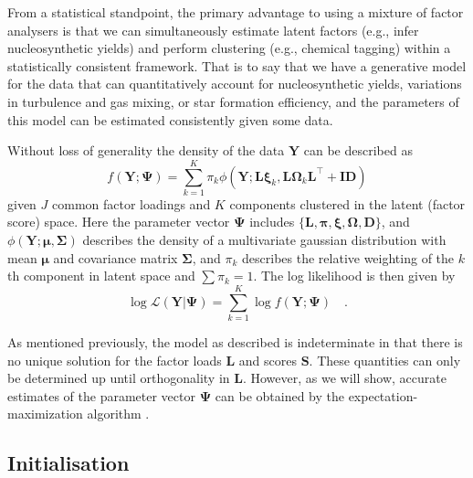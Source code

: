 \documentclass[twocolumn]{aastex62}
\newcommand{\vect}[1]{\boldsymbol{\mathbf{#1}}}
\renewcommand{\vec}[1]{\vect{#1}}
\newcommand{\weight}{\pi}
\newcommand{\data}{\textbf{Y}}
\newcommand{\vecdata}{\vec\data}
\newcommand{\transpose}{^\intercal}
\newcommand{\eye}{\textbf{I}}
\newcommand{\factorloads}{\textbf{L}}
\newcommand{\factorscores}{\textbf{S}}
\newcommand{\specificvariance}{\vec{D}}
\newcommand{\scoremeans}{\vec\xi}
\newcommand{\scorecovs}{\vec\Omega}
\newcommand{\NumLatentFactors}{J}
\newcommand{\NumComponents}{K}
\newcommand{\numcomponents}{k}
\begin{document}
From a statistical standpoint, the primary advantage to using
a mixture of factor analysers is that we can simultaneously
estimate latent factors (e.g., infer nucleosynthetic 
yields) and perform clustering (e.g., chemical tagging) 
within a statistically consistent framework. That is to say
that we have a generative model for the data that can 
quantitatively account for nucleosynthetic yields, variations in
turbulence and gas mixing, or star formation efficiency,
and the parameters of this model can be estimated consistently
given some data.

Without loss of generality the density of the data $\vecdata$ can be described as
\begin{equation}
	f(\vecdata; \vec\Psi) = \sum_{\numcomponents=1}^{\NumComponents}\weight_\numcomponents\phi(\vecdata;\factorloads\scoremeans_\numcomponents, \factorloads\scorecovs_\numcomponents\factorloads\transpose + \eye\specificvariance)
\end{equation}
\noindent{}given $\NumLatentFactors$ common factor loadings and $\NumComponents$ components
clustered in the latent (factor score) space. Here the parameter
vector
$\vec\Psi$ includes $\{\factorloads,\vec\pi,\scoremeans,\scorecovs,\specificvariance\}$, and $\phi(\vecdata;\vec\mu, \vec\Sigma)$
describes the density of a multivariate gaussian distribution with
mean $\vec\mu$ and covariance matrix $\vec\Sigma$,
and $\weight_\numcomponents$ describes the relative weighting of the $\numcomponents$th
component in latent space and $\sum\weight_\numcomponents = 1$.
The log likelihood is then given by
\begin{equation}
	\log\mathcal{L}(\vecdata|\vec\Psi) = \sum_{\numcomponents=1}^{\NumComponents}\log{f(\vecdata;\vec\Psi)} \quad . \label{eq:log-likelihood}
\end{equation}


As mentioned previously, the model as described is indeterminate in that
there is no unique solution for the factor loads $\factorloads$ and scores
$\factorscores$. These quantities can only be determined up until 
orthogonality in $\factorloads$. However, as we will show, accurate estimates
of the parameter vector $\vec\Psi$ can be obtained by the expectation-maximization
algorithm \citep{Dempster:1977}. 


\subsection{Initialisation}
\end{document}
